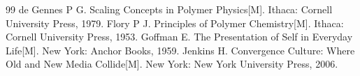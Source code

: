 \begin{thebibliography}{99}
 de Gennes P G. Scaling Concepts in Polymer Physics[M]. Ithaca: Cornell University Press, 1979.
 Flory P J. Principles of Polymer Chemistry[M]. Ithaca: Cornell University Press, 1953.
 Goffman E. The Presentation of Self in Everyday Life[M]. New York: Anchor Books, 1959.
 Jenkins H. Convergence Culture: Where Old and New Media Collide[M]. New York: New York University Press, 2006.
\end{thebibliography}
